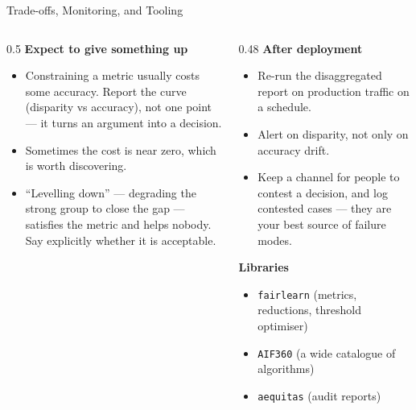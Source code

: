 \begin{frame}{Trade-offs, Monitoring, and Tooling}
    \begin{columns}[T]
        \begin{column}{0.5\textwidth}
            \textbf{Expect to give something up}
            \begin{itemize}\small
                \setlength\itemsep{0.3em}
                \item Constraining a metric usually costs some accuracy. Report the curve
                      (disparity vs accuracy), not one point --- it turns an argument into a
                      decision.
                \item Sometimes the cost is near zero, which is worth discovering.
                \item ``Levelling down'' --- degrading the strong group to close the gap ---
                      satisfies the metric and helps nobody. Say explicitly whether it is acceptable.
            \end{itemize}
        \end{column}
        \begin{column}{0.48\textwidth}
            \textbf{After deployment}
            \begin{itemize}\small
                \setlength\itemsep{0.3em}
                \item Re-run the disaggregated report on production traffic on a schedule.
                \item Alert on disparity, not only on accuracy drift.
                \item Keep a channel for people to contest a decision, and log contested cases ---
                      they are your best source of failure modes.
            \end{itemize}
            \vspace{0.5em}
            \textbf{Libraries}
            \begin{itemize}\small
                \item \texttt{fairlearn} (metrics, reductions, threshold optimiser)
                \item \texttt{AIF360} (a wide catalogue of algorithms)
                \item \texttt{aequitas} (audit reports)
            \end{itemize}
        \end{column}
    \end{columns}
\end{frame}
